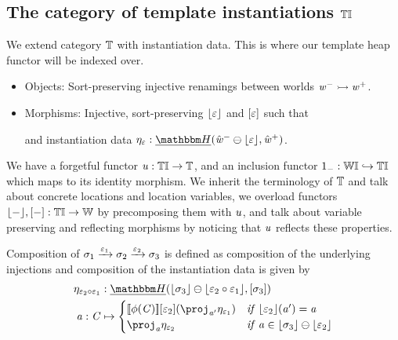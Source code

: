 
\subsection[Category of Template Instantiations]{The category of template instantiations ${\mathbb{T}\mathbb{I}}$}

We extend category $\mathbb{T}$ with instantiation data. 
This is where our template heap functor will be indexed over.
\begin{itemize}
    \item Objects: Sort-preserving injective renamings between worlds ${\mathit{w}}^- \rightarrowtail {\mathit{w}}^+$.
    \item Morphisms: Injective, sort-preserving $\lfloor\varepsilon\rfloor$ and $[\varepsilon]$ such that
                    \begin{center}
                    \end{center}
                    and instantiation data $\mvarM_\me : \dheapF(\Minus{\hat\vw} \ominus \concL\me, \Plus{\hat\vw})$.
\end{itemize}
We have a forgetful functor $\mathit{u} : {\mathbb{T}\mathbb{I}} \to \mathbb{T}$, and an inclusion functor
$1_{-} : \mathbb{W}\mathbb{I} \hookrightarrow {\mathbb{T}\mathbb{I}}$ which maps to its identity morphism.
We inherit the terminology of $\mathbb{T}$ and talk about concrete locations and location variables, 
we overload functors $\lfloor-\rfloor,[-] : {\mathbb{T}\mathbb{I}} \to \mathbb{W}$ by precomposing them with $\mathit{u}$,
and talk about variable preserving and reflecting morphisms by noticing that $\mathit{u}$ reflects these properties.

\begin{definition}
Composition of $\sigma_1 \xrightarrow{\varepsilon_1} \sigma_2 \xrightarrow{\varepsilon_2} \sigma_3$ is defined as composition of the underlying injections and composition of the instantiation data is given by
\begin{align*}
        \mvarM_{\me_2 \comp \me_1} &: \dheapF(\concL{\sigma_3} \ominus \concL{\me_2 \comp \me_1}, \anyL{\sigma_3}) \\
        \va : \vC & \mapsto \begin{cases}\sem{\phi(\vC)}\anyL{\me_2}(\proj_{\va'}\mvarM_{\me_1}) & \mif \concL{\me_2}(\va') = \va \\
                                         \proj_\va{\mvarM_{\me_2}} & \mif \va \in \concL{\sigma_3} \ominus \concL{\me_2}
                            \end{cases}
\end{align*}
\end{definition}


